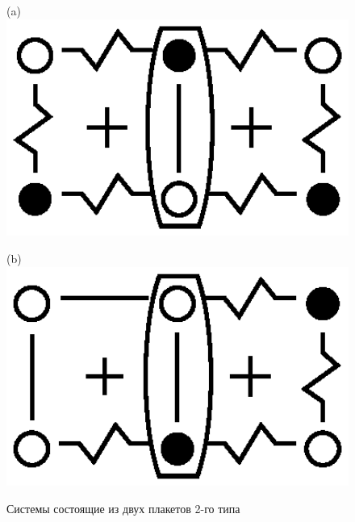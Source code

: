 \documentclass[utf8, babel, sor, jor, amsmath, amssymb, reprint]{elsarticle} %
\begin{document}
\begin{figure}[H]
	\centering
	\begin{minipage}{0.2\textwidth}
		\centering
		(a)
		\includegraphics[width=1\textwidth]{pictures/Type2_3x2.eps}
		\label{fig:Type2_3x2}
	\end{minipage}
	\hspace{20pt}
	\begin{minipage}{0.2\textwidth}
		\centering
		(b)
		\includegraphics[width=1\textwidth]{pictures/Type2_3x2_2.eps}
		\label{fig:Type2_3x2_2}
	\end{minipage}
	\caption{Системы состоящие из двух плакетов 2-го типа}
	\label{fig:Type2_32}
\end{figure}
\end{document}
